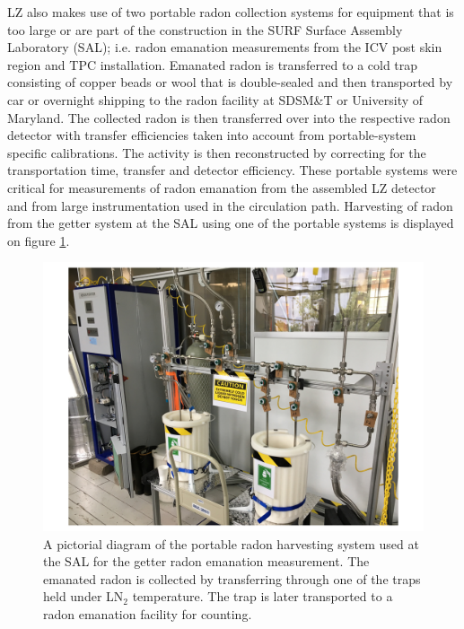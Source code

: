 LZ also makes use of two portable radon collection systems for equipment that is too large or are part of the construction in the SURF Surface Assembly Laboratory (SAL); i.e. radon emanation measurements from the ICV post skin region and TPC installation. Emanated radon is transferred to a cold trap consisting of copper beads or wool that is double-sealed and then transported by car or overnight shipping to the radon facility at SDSM\&T or University of Maryland. The collected radon is then transferred over into the respective radon detector with transfer efficiencies taken into account from portable-system specific calibrations. The activity is then reconstructed by correcting for the transportation time, transfer and detector efficiency. These portable systems were critical for measurements of radon emanation from the assembled LZ detector and from large instrumentation used in the circulation path. Harvesting of radon from the getter system at the SAL using one of the portable systems is displayed on figure \ref{fig:portable_radon_harvesting_system}.
%
\begin{figure}[b]
    \centering
    \includegraphics[scale=0.45]{Chapter_4/Figures/portable_system_operation.pdf}
    \caption[A pictorial diagram of the portable radon harvesting system used at the SAL for the getter radon emanation measurement.]
    {A pictorial diagram of the portable radon harvesting system used at the SAL for the getter radon emanation measurement. The emanated radon is collected by transferring through one of the traps held under LN$_{2}$ temperature. The trap is later transported to a radon emanation facility for counting.}
    \label{fig:portable_radon_harvesting_system}
\end{figure}
%


